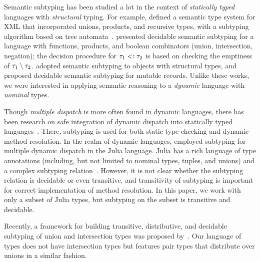 Semantic subtyping has been studied a lot in the context of \emph{statically
typed} languages with \emph{structural} typing. 
For example, \citet{bib:Hosoya:2003:XDuce} defined 
a semantic type system for XML that incorporated unions, products,
and recursive types, with a subtyping algorithm based on tree 
automata~\cite{bib:Hosoya:2005:XML}.
\citet{bib:Frisch:2008:sem-sub} presented decidable semantic subtyping
for a language with functions, products, and boolean combinators 
(union, intersection, negation); the decision procedure 
for $\tau_1 <: \tau_2$ is based on checking
the emptiness of $\tau_1 \setminus \tau_2$. 
\citet{bib:Dardha:2013:semsub-oo} adopted semantic subtyping
to objects with structural types, and \citet{bib:Ancona:2016:sem-sub-oo} 
proposed decidable semantic subtyping for mutable records.
Unlike these works, we were interested in applying semantic reasoning
to a \emph{dynamic} language with \emph{nominal} types.

Though \emph{multiple dispatch} is more often found in dynamic languages,
there has been research on safe integration of dynamic dispatch into
statically typed languages~\cite{bib:Chambers:1992:Cecil, 
Castagna:1992:COF:141471.141537, bib:Clifton:2000:MultiJava,
Park:2019:PSM:3302515.3290324}. There, subtyping is used for both
static type checking and dynamic method resolution.
In the realm of dynamic languages, \citet{Bezanson2015AbstractionIT} 
employed subtyping for multiple dynamic dispatch in the Julia language.
Julia has a rich language of type annotations 
(including, but not limited to nominal types, tuples, and unions) 
and a complex subtyping relation~\cite{ZappaNardelli:2018:JSR:3288538.3276483}. 
However, it is not clear whether the subtyping relation is decidable 
or even transitive, and transitivity of subtyping is important
for correct implementation of method resolution.
In this paper, we work with only a subset of Julia types, 
but subtyping on the subset is transitive and decidable.

Recently, a framework for building transitive, distributive,
and decidable subtyping of union and intersection types was proposed 
by~\citet{Muehlboeck:2018:EUI:3288538.3276482}.
Our language of types does not have intersection types but features
pair types that distribute over unions in a similar fashion.

